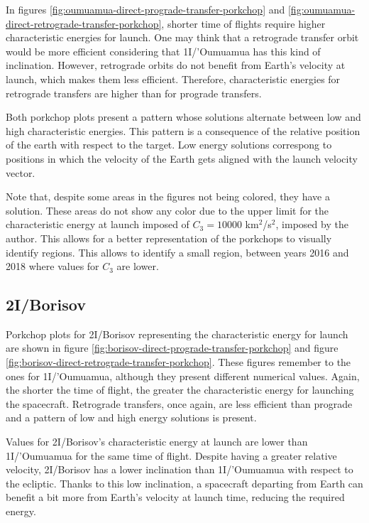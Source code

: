 In figures \ref{fig:oumuamua-direct-prograde-transfer-porkchop} and
\ref{fig:oumuamua-direct-retrograde-transfer-porkchop}, shorter time of flights
require higher characteristic energies for launch. One may think that a
retrograde transfer orbit would be more efficient considering that 1I/'Oumuamua has
this kind of inclination. However, retrograde orbits do not benefit from Earth's
velocity at launch, which makes them less efficient. Therefore, characteristic
energies for retrograde transfers are higher than for prograde transfers.

Both porkchop plots present a pattern whose solutions alternate between low and
high characteristic energies. This pattern is a consequence of the relative
position of the earth with respect to the target. Low energy solutions
correspong to positions in which the velocity of the Earth gets aligned with the
launch velocity vector.

Note that, despite some areas in the figures not being colored, they have a
solution. These areas do not show any color due to the upper limit for the characteristic
energy at launch imposed of $C_3 = 10000$ km$^2$/s$^2$, imposed by the
author. This allows for a better representation of the porkchops to visually
identify regions. This allows to identify a small region, between years 2016 and
2018 where values for $C_3$ are lower.

\subsection{2I/Borisov}

Porkchop plots for 2I/Borisov representing the characteristic energy for launch
are shown in figure \ref{fig:borisov-direct-prograde-transfer-porkchop} and
figure \ref{fig:borisov-direct-retrograde-transfer-porkchop}. These figures
remember to the ones for 1I/'Oumuamua, although they present different numerical
values. Again, the shorter the time of flight, the greater the characteristic
energy for launching the spacecraft. Retrograde transfers, once again, are less
efficient than prograde and a pattern of low and high energy solutions is
present.

Values for 2I/Borisov's characteristic energy at launch are lower than 1I/'Oumuamua
for the same time of flight. Despite having a greater relative velocity, 2I/Borisov
has a lower inclination than 1I/'Oumuamua with respect to the ecliptic. Thanks to
this low inclination, a spacecraft departing from Earth can benefit a bit more
from Earth's velocity at launch time, reducing the required energy.

